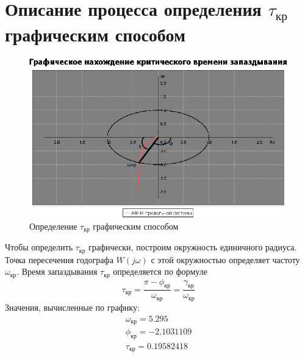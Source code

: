 \documentclass[12pt]{article}
\begin{document}
\section{Описание процесса определения $\tau_{кр}$ графическим способом}
\begin{figure}[h]
     \centering
    \includegraphics[width = \linewidth]{графически.png}
    \caption{Определение $\tau_{кр}$ графическим способом}
\end{figure} 
Чтобы определить $\tau_{кр}$ графически, построим окружность единичного радиуса. Точка пересечения годографа $W(j\omega)$ с этой окружностью определяет частоту $\omega_{кр}$. Время запаздывания $\tau_{кр}$ определяется по формуле
\begin{equation}
    \tau_{кр} = \frac{\pi - \phi_{кр}}{\omega_{кр}} = \frac{\gamma_{кр}}{\omega_{кр}}
\end{equation}
Значения, вычисленные по графику: 
\begin{equation}
    \begin{gathered}
    \omega_{кр} = 5.295 \\
    \phi_{кр} = -2.1031109 \\
    \tau_{кр} = 0.19582418
    \end{gathered}
\end{equation}
\newpage
\end{document}
